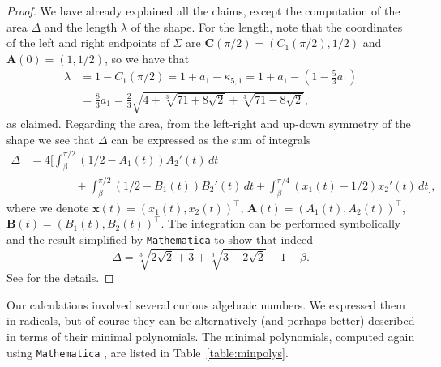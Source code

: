 \documentclass[11pt]{article}
\begin{document}
\begin{proof} We have already explained all the claims, except the computation of the area $\Delta$ and the length $\lambda$ of the shape. 
For the length, note that the coordinates of the left and right endpoints of $\Sigma$ are $\mathbf{C}(\pi/2)=(C_1(\pi/2),1/2)$ and $\mathbf{A}(0)=(1,1/2)$, so we have that
\begin{align*}
\lambda &= 1-C_1(\pi/2) = 1+a_1-\kappa_{5,1}=1+a_1-\left(1-\frac53 a_1\right)
\\ &=  \frac83 a_1 = \frac{2}{3} \sqrt{4+\sqrt[3]{71+8 \sqrt{2}}+\sqrt[3]{71-8 \sqrt{2}}},
\end{align*}
as claimed. Regarding the area, from the left-right and up-down symmetry of the shape we see that $\Delta$ can be expressed as the sum of integrals
\begin{align*}
\Delta &= 4\Bigg[\int_\beta^{\pi/2} (1/2-A_1(t))A_2'(t)\,dt
\\ & \qquad\qquad
+ \int_\beta^{\pi/2} (1/2-B_1(t))B_2'(t)\,dt  +
\int_\beta^{\pi/4} (x_1(t)-1/2)x_2'(t)\,dt\Bigg],
\end{align*}
where we denote $\mathbf{x}(t)=(x_1(t),x_2(t))^\top$, $\mathbf{A}(t)=(A_1(t),A_2(t))^\top$, $\mathbf{B}(t)=(B_1(t),B_2(t))^\top$. The integration can be performed symbolically and the result simplified by \texttt{Mathematica}
to show that indeed
$$
\Delta = \sqrt[3]{2 \sqrt{2}+3}+\sqrt[3]{3-2 \sqrt{2}}-1 + \beta.
$$
See \cite[Section~11]{romik-sofa-mathematica} for the details.
\end{proof}

Our calculations involved several curious algebraic numbers. We expressed them in radicals, but of course they can be alternatively (and perhaps better) described in terms of their minimal polynomials. The minimal polynomials, computed again using \texttt{Mathematica} \cite[Section~12]{romik-sofa-mathematica}, are listed in Table~\ref{table:minpolys}.
\end{document}
